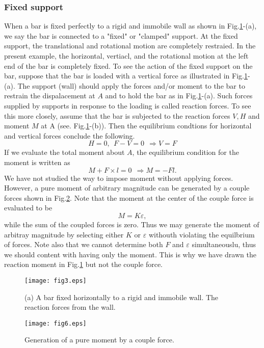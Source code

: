 \documentclass[10pt,a4j]{article}
\begin{document}
\subsubsection{Fixed support}
When a bar is fixed perfectly to a rigid and immobile wall as shown in Fig.\ref{fig:fig3}-(a), 
we say the bar is connected to a "fixed" or "clamped" support. 
At the fixed support, the translational and rotational motion are completely restraied. 
In the present example, the horizontal, vertiacl, and the rotational motion at the left 
end of the bar is completely fixed.
To see the action of the fixed support on the bar, suppose that the bar is loaded with
a vertical force as illustrated in Fig.\ref{fig:fig3}-(a).
The support (wall) should apply the forces and/or moment to the bar to restrain the 
dispalacement at $A$ and to hold the bar as in Fig.\ref{fig:fig3}-(a). 
Such forces supplied by supports in response to the loading is called reaction forces. 
To see this more closely, assume that the bar is subjected to the reaction forces $V,H$ 
and moment $M$ at A (see. Fig.\ref{fig:fig3}-(b)).
Then the equilibrium condtions for horizontal and vertical forces conclude the following. 
\begin{equation}
	H=0, \ \ F-V=0 \ \ \Rightarrow V=F
	\label{eqn:}
\end{equation}
If we evaluate the total moment about $A$, the equilibrium condition for the moment  
 is written as 
\begin{equation}
	M+F\times l =0 \ \ \Rightarrow M=-Fl.
	\label{eqn:}
\end{equation}
We have not studied the way to impose moment without applying forces.
However, a pure moment of arbitrary magnitude can be generated by 
a couple forces shown in Fig.\ref{fig:fig6}. Note that the moment at the 
center of the couple force is evaluated to be 
\begin{equation}
	M=K\varepsilon, 
	\label{eqn:}
\end{equation}
while the sum of the coupled forces is zero. 
Thus we may generate the moment of arbitray magnitude by selecting 
 either $K$ or $\varepsilon$ withouth violating the equilbrium of forces. 
 Note also that we cannot determine both $F$ and $\varepsilon$ simultaneouslu, thus 
we should content with having only the moment. 
This is why we have drawn the reaction moment in Fig.\ref{fig:fig3} but not the couple force.
\begin{figure}[h]
	\begin{center}
	\texttt{[image: fig3.eps]} 
	\end{center}
	\caption{(a) A bar fixed horizontally to a rigid and immobile wall. 
	The reaction forces from the wall.} 
	\label{fig:fig3}
\end{figure}
\begin{figure}[h]
	\begin{center}
	\texttt{[image: fig6.eps]} 
	\end{center}
	\caption{Generation of a pure moment by a couple force.} 
	\label{fig:fig6}
\end{figure}
\end{document}
